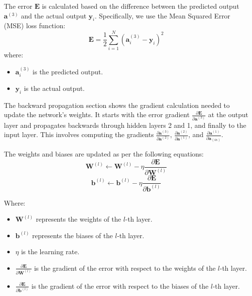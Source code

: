 \documentclass{ioereport}
\begin{document}
The error \( \mathbf{E} \) is calculated based on the difference between the predicted output \( \mathbf{a}^{(3)} \) and the actual output \( \mathbf{y}_i \). Specifically, we use the Mean Squared Error (MSE) loss function:
\begin{equation}
    \mathbf{E} = \frac{1}{2} \sum_{i=1}^{N} (\mathbf{a}^{(3)}_i - \mathbf{y}_i)^2
\end{equation}
where:
\begin{itemize}
    \item \( \mathbf{a}^{(3)}_i \) is the predicted output.
    \item \( \mathbf{y}_i \) is the actual output.
\end{itemize}

The backward propagation section shows the gradient calculation needed to update the network's weights. It starts with the error gradient \( \frac{\partial \mathbf{E}}{\partial \mathbf{a}^{(3)}} \) at the output layer and propagates backwards through hidden layers 2 and 1, and finally to the input layer. This involves computing the gradients \( \frac{\partial \mathbf{a}^{(3)}}{\partial \mathbf{a}^{(2)}} \), \( \frac{\partial \mathbf{a}^{(2)}}{\partial \mathbf{a}^{(1)}} \), and \( \frac{\partial \mathbf{a}^{(1)}}{\partial \mathbf{a}_{(in)}} \).

The weights and biases are updated as per the following equations:
\begin{equation}
    \mathbf{W}^{(l)} \leftarrow \mathbf{W}^{(l)} - \eta \frac{\partial \mathbf{E}}{\partial \mathbf{W}^{(l)}}  
\end{equation}
\begin{equation}
    \mathbf{b}^{(l)} \leftarrow \mathbf{b}^{(l)} - \eta \frac{\partial \mathbf{E}}{\partial \mathbf{b}^{(l)}}  
\end{equation}

Where:
\begin{itemize}
    \item \( \mathbf{W}^{(l)} \) represents the weights of the \( l \)-th layer.
    \item \( \mathbf{b}^{(l)} \) represents the biases of the \( l \)-th layer.
    \item \( \eta \) is the learning rate.
    \item \( \frac{\partial \mathbf{E}}{\partial \mathbf{W}^{(l)}} \) is the gradient of the error with respect to the weights of the \( l \)-th layer.
    \item \( \frac{\partial \mathbf{E}}{\partial \mathbf{b}^{(l)}} \) is the gradient of the error with respect to the biases of the \( l \)-th layer.
\end{itemize}
\end{document}
